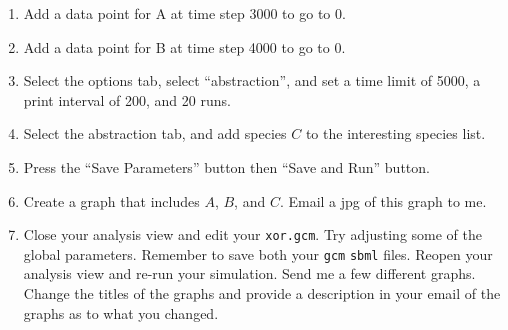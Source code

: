 \documentclass[titlepage,11pt]{article}
\begin{document}
\begin{enumerate}
\item Add a data point for A at time step 3000 to go to 0.

\item Add a data point for B at time step 4000 to go to 0.

\item Select the options tab, select ``abstraction'', and 
      set a time limit of 5000, a print interval of 200, and 20 runs.  

\item Select the abstraction tab, and add species $C$ to the interesting 
      species list.

\item Press the ``Save Parameters'' button then ``Save and Run'' button.

\item Create a graph that includes $A$, $B$, and $C$.  Email a jpg
      of this graph to me.

\item Close your analysis view and edit your {\tt xor.gcm}.  Try adjusting
      some of the global parameters.  Remember to save both your {\tt gcm}
      {\tt sbml} files.  Reopen your analysis view and re-run your simulation.
      Send me a few different graphs.  Change the titles of the graphs 
      and provide a description in your email of the graphs as to what you
      changed.
\end{enumerate}
  
\end{document}
